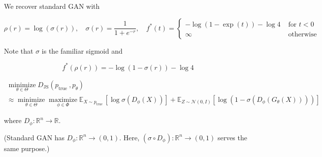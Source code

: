 \documentclass{report}
\begin{document}
\begin{concept}
    We recover standard GAN with

    $$
    \rho(r)=\log (\sigma(r)), \quad \sigma(r)=\frac{1}{1+e^{-r}}, \quad f^{*}(t)= \begin{cases}-\log (1-\exp (t))-\log 4 & \text { for } t<0 \\ \infty & \text { otherwise }\end{cases}
    $$

    Note that $\sigma$ is the familiar sigmoid and

    $$
    f^{*}(\rho(r))=-\log (1-\sigma(r))-\log 4
    $$

    $$
    \begin{gathered}
    \underset{\theta \in \Theta}{\operatorname{minimize}} D_{\mathrm{JS}}\left(p_{\text {true }}, p_{\theta}\right) \\
    \approx \underset{\theta \in \Theta}{\operatorname{minimize}} \underset{\phi \in \Phi}{\operatorname{maximize}} \mathbb{E}_{X \sim p_{\text {true }}}\left[\log \sigma\left(D_{\phi}(X)\right)\right]+\mathbb{E}_{Z \sim \mathcal{N}(0, I)}\left[\log \left(1-\sigma\left(D_{\phi}\left(G_{\theta}(X)\right)\right)\right)\right]
    \end{gathered}
    $$

    where $D_{\phi}: \mathbb{R}^{n} \rightarrow \mathbb{R}$.

    (Standard GAN has $D_{\phi}: \mathbb{R}^{n} \rightarrow(0,1)$. Here, $\left(\sigma \circ D_{\phi}\right): \mathbb{R}^{n} \rightarrow(0,1)$ serves the same purpose.)
\end{concept}
\end{document}
